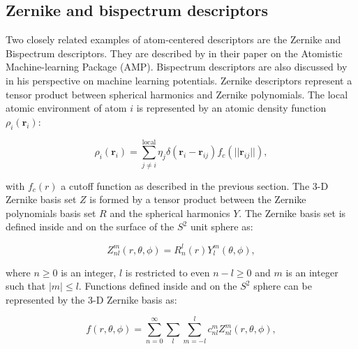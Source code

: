 \subsection{Zernike and bispectrum descriptors}
Two closely related examples of atom-centered descriptors
are the Zernike and Bispectrum descriptors.
They are described by \parencite[Khorshidi, Alireza and Peterson,
Andrew A.]{khorshidi2016amp} in their paper
on the Atomistic Machine-learning Package (AMP).
Bispectrum descriptors are also discussed by
\parencite[Behler, J\"{o}rg]{behler2016perspective}
in his perspective on machine learning potentials.
Zernike descriptors represent a tensor product between spherical
harmonics and Zernike polynomials. The local atomic environment
of atom $i$ is represented by an atomic density function $\rho_i(\bm{r}_i)$:

\begin{equation}
 \rho_i(\bm{r}_i) = \sum_{j\neq i}^{\text{local}}
    \eta_j \delta \left( \bm{r}_i - \bm{r}_{ij} \right)
    f_c \left( \lvert \lvert \bm{r}_{ij} \rvert \rvert \right) , 
\end{equation}

with $f_c(r)$ a cutoff function as described in the previous section.
The 3-D Zernike basis set $Z$ is formed by a tensor product between
the Zernike polynomials basis set $R$ and the spherical harmonics
$Y$. The Zernike basis set is defined inside and on the surface
of the $S^2$ unit sphere as:

\begin{equation}
 Z_{nl}^m (r, \theta, \phi) = R_n^l(r) Y_l^m(\theta, \phi) , 
\end{equation}

where $n \geq 0$ is an integer, $l$ is restricted to even $n - l \geq 0$
and $m$ is an integer such that $\left| m \right| \leq l$.
Functions defined inside and on the $S^2$ sphere
can be represented by the 3-D Zernike basis as:

\begin{equation}
 f(r, \theta, \phi) = \sum_{n=0}^{\infty} \sum_l \sum_{m=-l}^l
    c_{nl}^m Z_{nl}^m (r, \theta, \phi) , 
\end{equation}


